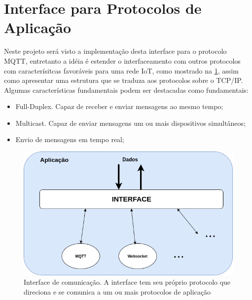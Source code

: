 \section{Interface para Protocolos de Aplicação}
\label{section:interface_iot}

Neste projeto será visto a implementação desta interface para o protocolo MQTT, entretanto a idéia é estender o interfaceamento com outros protocolos com caracterísitcas favoráveis para uma rede IoT, como mostrado na \ref{fig:2.2.0/camada_abatracao}, assim como apresentar uma estrutura que se traduza aos protocolos sobre o TCP/IP. Algumas características fundamentais podem ser destacadas como fundamentais:

\begin{itemize}

\item Full-Duplex. Capaz de receber e enviar mensagens ao mesmo tempo;
\item Multicast. Capaz de enviar mensagens um ou mais dispositivos simultâneos;
\item Envio de mensagens em tempo real;

\end{itemize}


\begin{figure}[h!]
\centering
\includegraphics[width=12cm]{./02_Capitulos/02_Cap2/figures/camada_abstracao}
\caption{Interface de comunicação. A interface tem seu próprio protocolo que direciona e se comunica a um ou mais protocolos de aplicação}
\label{fig:2.2.0/camada_abatracao}
\end{figure}


